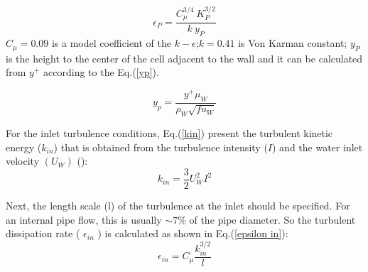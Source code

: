 \documentclass[review,3p,times,12pt]{elsarticle}
\begin{document}
\begin{equation}
\epsilon_{P} =\frac{C^{3/4}_{\mu } \ K^{3/2}_{P}}{k\ y_{P}}
\label{epsilonp}
\end{equation}
\(C_{\mu}=0.09\) is a model coefficient of the \(k-\epsilon\);\quad $k=0.41$ is Von Karman constant; \quad $y_{P}$ is the height to the center of the cell adjacent to the wall and it can be calculated from $y^+$ according to the Eq.(\ref{yp}).

\begin{equation}
y_{p}=\frac{y^{+} \mu_W}{\rho_W\sqrt{f u_{W}}}
\label{yp}
\end{equation}

For the inlet turbulence conditions, Eq.(\ref{kin}) present the turbulent kinetic energy (\(k_{in}\)) that is obtained from the turbulence intensity (\(I\)) and the water inlet velocity \((U_W)\) (\citet{Messa-2020}):
\begin{equation}
k_{in} =\frac{3}{2} U_W^{2} I^{2} 
\label{kin}
\end{equation}

Next, the length scale (l) of the turbulence at the inlet should be specified. For an internal pipe flow, this is usually \(\sim 7 \%\) of the pipe diameter. So the turbulent dissipation rate ( \(\epsilon_{in}\) ) is calculated as shown in Eq.(\ref{epsilon in}): 
\begin{equation}
\epsilon_{in}=C_{\mu} \frac{k_{in}^{3 / 2}}{l} 
\label{epsilon in}
\end{equation}


\end{document}
